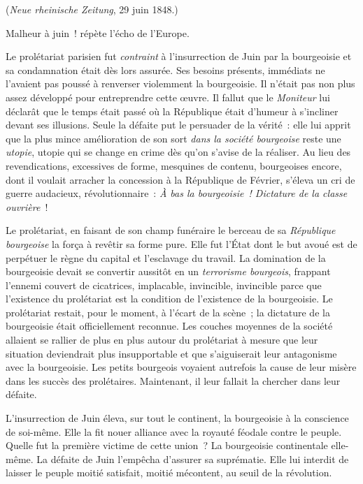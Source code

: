 \documentclass[french,twoside]{book} %
\begin{document}
{\raggedleft \noindent (\emph{Neue rheinische Zeitung}, 29 juin 1848.)\par}
\noindent Malheur à juin ! répète l’écho de l’Europe.\par
Le prolétariat parisien fut \emph{contraint} à l’insurrection de Juin par la bourgeoisie et sa condamnation était dès lors assurée. Ses besoins présents, immédiats ne l’avaient pas poussé à renverser violemment la bourgeoisie. Il n’était pas non plus assez développé pour entreprendre cette œuvre. Il fallut que le \emph{Moniteur} lui déclarât que le temps était passé où la République était d’humeur à s’incliner devant ses illusions. Seule la défaite put le persuader de la vérité : elle lui apprit que la plus mince amélioration de son sort \emph{dans la société bourgeoise} reste une \emph{utopie}, utopie qui se change en crime dès qu’on s’avise de la réaliser. Au lieu des revendications, excessives de forme, mesquines de contenu, bourgeoises encore, dont il voulait arracher la concession à la République de Février, s’éleva un cri de guerre audacieux, révolutionnaire : \emph{À bas la bourgeoisie ! Dictature de la classe ouvrière} !\par
Le prolétariat, en faisant de son champ funéraire le berceau de sa \emph{République bourgeoise} la força à revêtir sa forme pure. Elle fut l’État dont le but avoué est de perpétuer le règne du capital et l’esclavage du travail. La domination de la bourgeoisie devait se convertir aussitôt en un \emph{terrorisme bourgeois}, frappant l’ennemi couvert de cicatrices, implacable, invincible, invincible parce que l’existence du prolétariat est la condition de l’existence de la bourgeoisie. Le prolétariat restait, pour le moment, à l’écart de la scène ; la dictature de la bourgeoisie était officiellement reconnue. Les couches moyennes de la société allaient se rallier de plus en plus autour du prolétariat à mesure que leur situation deviendrait plus insupportable et que s’aiguiserait leur antagonisme avec la bourgeoisie. Les petits bourgeois voyaient autrefois la cause de leur misère dans les succès des prolétaires. Maintenant, il leur fallait la chercher dans leur défaite.\par
L’insurrection de Juin éleva, sur tout le continent, la bourgeoisie à la conscience de soi-même. Elle la fit nouer alliance avec la royauté féodale contre le peuple. Quelle fut la première victime de cette union ? La bourgeoisie continentale elle-même. La défaite de Juin l’empêcha d’assurer sa suprématie. Elle lui interdit de laisser le peuple moitié satisfait, moitié mécontent, au seuil de la révolution.\par
\end{document}
